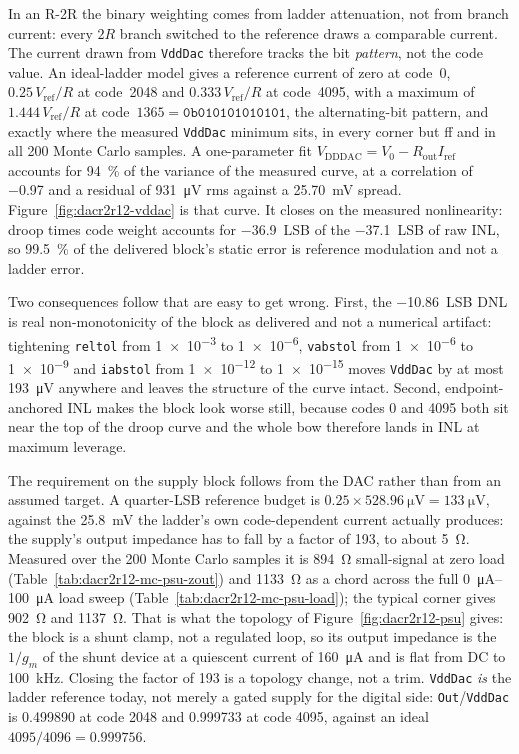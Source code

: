 In an R-2R the binary weighting comes from ladder attenuation, not from branch current:
every \(2R\) branch switched to the reference draws a comparable current. The current
drawn from \texttt{VddDac} therefore tracks the bit \emph{pattern}, not the code value.
An ideal-ladder model gives a reference current of zero at code~0,
\(0.25\,V_{\mathrm{ref}}/R\) at code~2048 and \(0.333\,V_{\mathrm{ref}}/R\) at code~4095,
with a maximum of \(1.444\,V_{\mathrm{ref}}/R\) at code~\(1365 =
\mathtt{0b010101010101}\), the alternating-bit pattern, and exactly where the measured
\texttt{VddDac} minimum sits, in every corner but ff and in all 200 Monte Carlo samples.
A one-parameter fit \(V_{\mathrm{DDDAC}} = V_0 - R_{\mathrm{out}} I_{\mathrm{ref}}\)
accounts for \SI{94}{\percent} of the variance of the measured curve, at a correlation of
\num{-0.97} and a residual of \SI{931}{\micro\volt} rms against a \SI{25.70}{\milli\volt}
spread. Figure~\ref{fig:dacr2r12-vddac} is that curve. It closes on the measured
nonlinearity: droop times code weight accounts for \SI{-36.9}{LSB} of the
\SI{-37.1}{LSB} of raw INL, so \SI{99.5}{\percent} of the delivered block's static error
is reference modulation and not a ladder error.

Two consequences follow that are easy to get wrong. First, the
\SI{-10.86}{LSB} DNL is real non-monotonicity of the block as delivered and not a
numerical artifact: tightening \texttt{reltol} from \num{1e-3} to \num{1e-6},
\texttt{vabstol} from \num{1e-6} to \num{1e-9} and \texttt{iabstol} from \num{1e-12} to
\num{1e-15} moves \texttt{VddDac} by at most \SI{193}{\micro\volt} anywhere and leaves the
structure of the curve intact. Second, endpoint-anchored INL makes the block look worse
still, because codes 0 and 4095 both sit near the top of the droop curve and the whole
bow therefore lands in INL at maximum leverage.

The requirement on the supply block follows from the DAC rather than from an assumed
target. A quarter-LSB reference budget is \(0.25 \times \SI{528.96}{\micro\volt} =
\SI{133}{\micro\volt}\), against the \SI{25.8}{\milli\volt} the ladder's own
code-dependent current actually produces: the supply's output impedance has to fall by a
factor of \num{193}, to about \SI{5}{\ohm}. Measured over the 200 Monte Carlo samples it
is \SI{894}{\ohm} small-signal at zero load (Table~\ref{tab:dacr2r12-mc-psu-zout}) and
\SI{1133}{\ohm} as a chord across the full \SIrange{0}{100}{\micro\ampere} load sweep
(Table~\ref{tab:dacr2r12-mc-psu-load}); the typical corner gives \SI{902}{\ohm} and
\SI{1137}{\ohm}. That is what the topology of
Figure~\ref{fig:dacr2r12-psu} gives: the block is a shunt clamp, not a regulated loop, so
its output impedance is the \(1/g_m\) of the shunt device at a quiescent current of
\SI{160}{\micro\ampere} and is flat from DC to \SI{100}{\kilo\hertz}. Closing the factor
of 193 is a topology change, not a trim. \texttt{VddDac} \emph{is} the ladder
reference today, not merely a gated supply for the digital side: \texttt{Out}/\texttt{VddDac}
is \num{0.499890} at code 2048 and \num{0.999733} at code 4095, against an ideal
\(4095/4096 = \num{0.999756}\).

